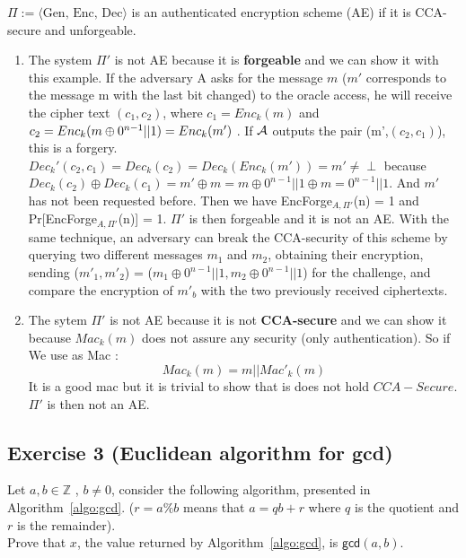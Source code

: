 \begin{solution}
$\Pi := \langle \text{Gen, Enc, Dec} \rangle$ is an authenticated encryption scheme (AE) if it is CCA-secure and unforgeable.
\begin{enumerate}
    \item The system $\Pi'$ is not AE because it is \textbf{forgeable} and we can show it with this example. If the adversary A asks for the message $m$ ($m'$ corresponds to the message m with the last bit changed) to the oracle access, he will receive the cipher text $(c_1, c_2)$, where $c_1 = Enc_k(m)$ and $c_2 = Enc_k(m\oplus 0^{n-1}||1) = Enc_k(m')$ . \newline \newline
    If $\mathcal{A}$ outputs the pair (m',$(c_2, c_1)$), this is a forgery. $Dec_k'(c_2,c_1) = Dec_k(c_2) = Dec_k(Enc_k(m')) = m' \neq \perp $ because $Dec_k(c_2) \oplus Dec_k(c_1) = m' \oplus m = m \oplus 0^{n-1}||1 \oplus m = 0^{n-1}||1 $. And $m'$ has not been requested before. \newline \newline
    Then we have EncForge$_{A, \Pi'}$(n) = 1  and Pr[EncForge$_{A, \Pi'}$(n)] = 1. $\Pi'$ is then forgeable and it is not an AE. 
    \newline
    With the same technique, an adversary can break the CCA-security of this scheme by querying two different messages $m_1$ and $m_2$, obtaining their encryption, sending \newline
    ($m'_1,m'_2$) = ($m_1 \oplus 0^{n-1}||1, m_2 \oplus 0^{n-1}||1$) for the challenge, and compare the encryption of $m'_b$ with the two previously received ciphertexts.
    \item The sytem $\Pi'$ is not AE because it is not \textbf{CCA-secure} and we can show it because $Mac_k(m)$ does not assure any security (only authentication). So if We use as Mac : 
    $$ Mac_k(m) = m||Mac'_k(m) $$
    It is a good mac but it is trivial to show that is does not hold $CCA-Secure$. $\Pi'$ is then not an AE.
\end{enumerate}
\end{solution}

\subsection{Exercise 3 (Euclidean algorithm for gcd)}
Let $a,b \in \mathbb{Z}$ , $b \neq 0$, consider the following algorithm, presented in Algorithm~\ref{algo:gcd}. ($r=a \% b$ means that $a=qb+r$ where $q$ is the quotient and $r$ is the remainder).\\
Prove that $x$, the value returned by Algorithm~\ref{algo:gcd}, is $\mathsf{gcd} (a,b)$.\\

